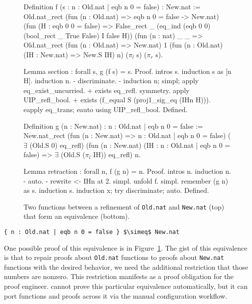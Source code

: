 \begin{figure}
\begin{minipage}{0.46\textwidth}
Definition f (s : { n : Old.nat | eqb n 0 = false}) : New.nat :=
  Old.nat_rect
    (fun (n : Old.nat) => eqb n 0 = false -> New.nat)
    (fun (H : eqb 0 0 = false) =>
       False_rect _
         (eq_ind (eqb 0 0) (bool_rect _ True False) I false H))
    (fun (n : nat) _ _ =>
      Old.nat_rect
        (fun (n : Old.nat) => New.nat)
        1
        (fun (n : Old.nat) (IH : New.nat) => New.S IH)
        n)
    ($\pi_l$ s)
    ($\pi_r$ s).

Lemma section :
  forall s, g (f s) = s.
Proof.
  intros s. induction s as [n H]. induction n.
  - discriminate.
  - induction n; simpl; apply eq_exist_uncurried. 
    + exists eq_refl. symmetry. apply UIP_refl_bool.
    + exists (f_equal S (proj1_sig_eq (IHn H))). 
      eapply eq_trans; eauto using UIP_refl_bool.
Defined.
\end{minipage}
\hfill
\begin{minipage}{0.46\textwidth}
Definition g (n : New.nat) : { n : Old.nat | eqb n 0 = false} :=
  New.nat_rect
    (fun (n : New.nat) => { n : Old.nat | eqb n 0 = false})
    ($\exists$ (Old.S 0) eq_refl)
    (fun (n : New.nat) (IH : { n : Old.nat | eqb n 0 = false}) =>
      $\exists$ (Old.S ($\pi_l$ IH)) eq_refl)
    n.








Lemma retraction :
  forall n, f (g n) = n.
Proof.
  intros n. induction n.
  - auto.
  - rewrite <- IHn at 2. simpl. unfold f. simpl. remember (g n) as s. induction s.
    induction x; try discriminate; auto.
Defined.
\end{minipage}
\caption{Two functions between a refinement of \lstinline{Old.nat} and \lstinline{New.nat} (top) that form an equivalence (bottom).}
\label{fig:equivalence2}
\end{figure}

\begin{lstlisting}
{ n : Old.nat | eqb n 0 = false } $\simeq$ New.nat 
\end{lstlisting}
One possible proof of this equivalence is in Figure~\ref{fig:equivalence2}.
The gist of this equivalence is that to repair proofs about \lstinline{Old.nat} functions to proofs about \lstinline{New.nat} functions with the desired behavior,
we need the additional restriction that those numbers are nonzero. 
This restriction manifests as a proof obligation for the proof engineer.
\toolname cannot prove this particular equivalence automatically, but it can
port functions and proofs across it via the manual configuration workflow. %

